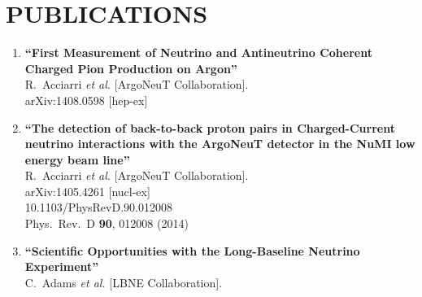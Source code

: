 \documentclass{res}
\begin{document}
\begin{resume}
\begin{itemize}
\end{itemize}
    
    
\section{PUBLICATIONS}
\vspace{0.3in}
\author{}
\date{}
\begin{enumerate}  \itemsep10pt


\item%
{\bf ``First Measurement of Neutrino and Antineutrino Coherent Charged Pion Production on Argon''}
  \\{}R.~Acciarri {\it et al.}  [ArgoNeuT Collaboration].
  \\{}arXiv:1408.0598 [hep-ex]
  



\item%
{\bf ``The detection of back-to-back proton pairs in Charged-Current neutrino interactions with the ArgoNeuT detector in the NuMI low energy beam line''}
  \\{}R.~Acciarri {\it et al.}  [ArgoNeuT Collaboration].
  \\{}arXiv:1405.4261 [nucl-ex]
    \\{}10.1103/PhysRevD.90.012008
\\{}Phys.\ Rev.\ D {\bf 90}, 012008 (2014) %



\item%
{\bf ``Scientific Opportunities with the Long-Baseline Neutrino Experiment''}
  \\{}C.~Adams {\it et al.}  [LBNE Collaboration].
  



\end{enumerate}
\end{resume}
\end{document}
